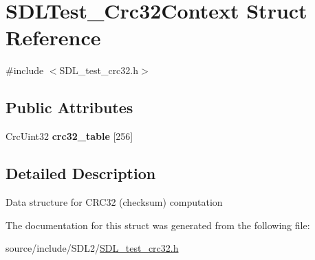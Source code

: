 \hypertarget{struct_s_d_l_test___crc32_context}{}\section{S\+D\+L\+Test\+\_\+\+Crc32\+Context Struct Reference}
\label{struct_s_d_l_test___crc32_context}


{\ttfamily \#include $<$S\+D\+L\+\_\+test\+\_\+crc32.\+h$>$}

\subsection*{Public Attributes}
\begin{DoxyCompactItemize}
\item 
\hypertarget{struct_s_d_l_test___crc32_context_ae95d0d0b48bafc4e2f6f032f754ffa4c}{}Crc\+Uint32 {\bfseries crc32\+\_\+table} \mbox{[}256\mbox{]}\label{struct_s_d_l_test___crc32_context_ae95d0d0b48bafc4e2f6f032f754ffa4c}

\end{DoxyCompactItemize}


\subsection{Detailed Description}
Data structure for C\+R\+C32 (checksum) computation 

The documentation for this struct was generated from the following file\+:\begin{DoxyCompactItemize}
\item 
source/include/\+S\+D\+L2/\hyperlink{_s_d_l__test__crc32_8h}{S\+D\+L\+\_\+test\+\_\+crc32.\+h}\end{DoxyCompactItemize}
